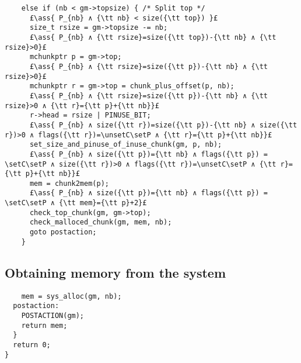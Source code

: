 \documentclass[10pt,twoside]{report}
\makeatletter
\newcommand{\ml}[2][t]{\mbox{\mdseries\begin{tabular}[#1]{@{}L@{}}#2\end{tabular}}}
\newcommand{\ass}[1]{\ensuremath{{\color{blue}\left\{\ml[c]{#1}\right\}}}}
\newcommand{\setC}{\raisebox{1.5pt}{$\blacktriangledown$}}
\newcommand{\unsetC}{\raisebox{1.5pt}{$\triangledown$}}
\newcommand{\setP}{{\blacktriangle}}
\makeatother
\begin{document}
\begin{lstlisting}
    else if (nb < gm->topsize) { /* Split top */
      £\ass{ P_{nb} ∧ {\tt nb} < size({\tt top}) }£
      size_t rsize = gm->topsize -= nb;
      £\ass{ P_{nb} ∧ {\tt rsize}=size({\tt top})-{\tt nb} ∧ {\tt rsize}>0}£
      mchunkptr p = gm->top;
      £\ass{ P_{nb} ∧ {\tt rsize}=size({\tt p})-{\tt nb} ∧ {\tt rsize}>0}£
      mchunkptr r = gm->top = chunk_plus_offset(p, nb);
      £\ass{ P_{nb} ∧ {\tt rsize}=size({\tt p})-{\tt nb} ∧ {\tt rsize}>0 ∧ {\tt r}={\tt p}+{\tt nb}}£
      r->head = rsize | PINUSE_BIT;
      £\ass{ P_{nb} ∧ size({\tt r})=size({\tt p})-{\tt nb} ∧ size({\tt r})>0 ∧ flags({\tt r})=\unsetC\setP ∧ {\tt r}={\tt p}+{\tt nb}}£
      set_size_and_pinuse_of_inuse_chunk(gm, p, nb);
      £\ass{ P_{nb} ∧ size({\tt p})={\tt nb} ∧ flags({\tt p}) = \setC\setP ∧ size({\tt r})>0 ∧ flags({\tt r})=\unsetC\setP ∧ {\tt r}={\tt p}+{\tt nb}}£
      mem = chunk2mem(p);
      £\ass{ P_{nb} ∧ size({\tt p})={\tt nb} ∧ flags({\tt p}) = \setC\setP ∧ {\tt mem}={\tt p}+2}£
      check_top_chunk(gm, gm->top);
      check_malloced_chunk(gm, mem, nb);
      goto postaction;
    }
\end{lstlisting}

\subsection*{Obtaining memory from the system}

\begin{lstlisting}
    mem = sys_alloc(gm, nb);
  postaction:
    POSTACTION(gm);
    return mem;
  }
  return 0;
}
\end{lstlisting}

\end{document}
